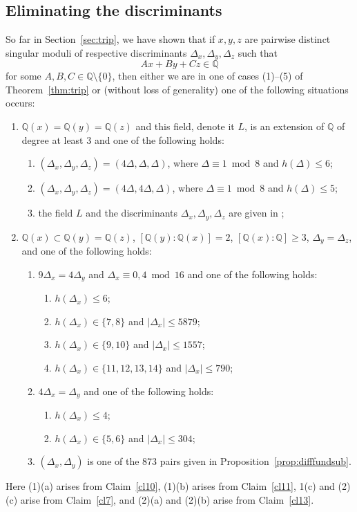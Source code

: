 \documentclass[11pt,a4paper, british]{amsart}
\theoremstyle{definition}
\theoremstyle{remark}
\numberwithin{equation}{section}
\newcommand{\Q}{\mathbb{Q}} %
\begin{document}
\subsection{Eliminating the discriminants}\label{subsec:elim}

So far in Section~\ref{sec:trip}, we have shown that if $x, y, z$ are pairwise distinct singular moduli of respective discriminants $\Delta_x, \Delta_y, \Delta_z$ such that
\[ Ax + By + Cz \in \Q\]
for some $A, B, C \in \Q \setminus \{0\}$, then either we are in one of cases (1)--(5) of Theorem~\ref{thm:trip} or (without loss of generality) one of the following situations occurs:

\begin{enumerate}
	\item $\Q(x) = \Q(y) = \Q(z)$ and this field, denote it $L$, is an extension of $\Q$ of degree at least $3$ and one of the following holds:
	\begin{enumerate}
		\item $(\Delta_x, \Delta_y, \Delta_z) = (4 \Delta, \Delta, \Delta)$, where $\Delta \equiv 1 \bmod 8$ and $h(\Delta) \leq 6$;
		\item $(\Delta_x, \Delta_y, \Delta_z) = (4 \Delta, 4 \Delta, \Delta)$, where $\Delta \equiv 1 \bmod 8$ and $h(\Delta) \leq 5$;
		\item the field $L$ and the discriminants $\Delta_x, \Delta_y, \Delta_z$ are given in \cite[Table~2]{AllombertBiluMadariaga15};
	\end{enumerate}
	\item $\Q(x) \subset \Q(y) = \Q(z)$,  $[\Q(y) : \Q(x)] = 2$, $[\Q(x) : \Q] \geq 3$, $\Delta_y = \Delta_z$, and one of the following holds:
	\begin{enumerate}
		\item $9 \Delta_x = 4 \Delta_y$ and $\Delta_x \equiv 0, 4 \bmod 16$ and one of the following holds:
		\begin{enumerate}
			\item $h(\Delta_x) \leq 6$;
			\item $h(\Delta_x) \in \{7, 8\}$ and $\lvert \Delta_x \rvert \leq 5879$;
			\item $h(\Delta_x) \in \{9, 10\}$ and $\lvert \Delta_x \rvert \leq 1557$;
			\item $h(\Delta_x) \in \{11, 12, 13, 14\}$ and $\lvert \Delta_x \rvert \leq 790$;
		\end{enumerate}
		\item $4 \Delta_x = \Delta_y$ and one of the following holds:
		\begin{enumerate}
			\item $h(\Delta_x) \leq 4$;
			\item $h(\Delta_x) \in \{5, 6\}$ and $\lvert \Delta_x \rvert \leq 304$;
		\end{enumerate}
		\item $(\Delta_x, \Delta_y)$ is one of the 873 pairs given in Proposition~\ref{prop:difffundsub}.
	\end{enumerate}
\end{enumerate}
Here (1)(a) arises from Claim~\ref{cl10}, (1)(b) arises from Claim~\ref{cl11}, 1(c) and (2)(c) arise from Claim~\ref{cl7}, and (2)(a) and (2)(b) arise from Claim~\ref{cl13}.
\end{document}
